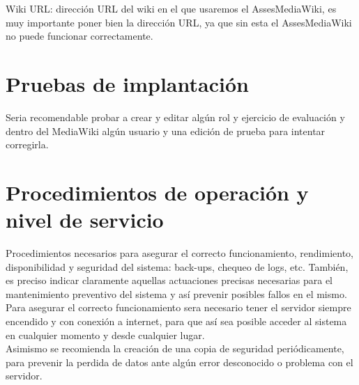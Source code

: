 Wiki URL: dirección URL del wiki en el que usaremos el AssesMediaWiki, es muy importante poner bien la dirección URL, ya que sin esta el AssesMediaWiki no puede funcionar correctamente.\\

\section{Pruebas de implantación}
Seria recomendable probar a crear y editar algún rol y ejercicio de evaluación y dentro del MediaWiki algún usuario y una edición de prueba para intentar corregirla.

\section{Procedimientos de operación y nivel de servicio}
Procedimientos necesarios para asegurar el correcto funcionamiento, rendimiento, disponibilidad y seguridad del sistema: back-ups, chequeo de logs, etc. También, es preciso indicar claramente aquellas actuaciones precisas necesarias para el mantenimiento preventivo del sistema y así prevenir posibles fallos en el mismo.\\

Para asegurar el correcto funcionamiento sera necesario tener el servidor siempre encendido y con conexión a internet, para que así sea posible acceder al sistema en cualquier momento y desde cualquier lugar.\\
Asimismo se recomienda la creación de una copia de seguridad periódicamente, para prevenir la perdida de datos ante algún error desconocido o problema con el servidor.
